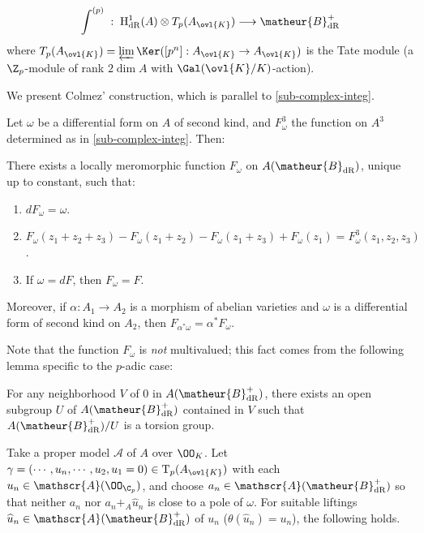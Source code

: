 \begin{equation*}
\int^{(p)}\;:\;\mathrm{H}^1_{\mathrm{dR}}(A) \otimes T_p(A_{\ovl{K}})
 \longrightarrow \matheur{B}^+_{\mathrm{dR}}
\end{equation*}
where $T_p(A_{\ovl{K}}) = \varprojlim \Ker([p^n]: A_{\ovl{K}}\rightarrow
A_{\ovl{K}})$ is the Tate module (a ${\Z}_p$-module of rank $2\dim A$
with $\Gal({\ovl{K}}/K)$-action).

We present Colmez' construction, which is parallel to \ref{sub-complex-integ}.

Let $\omega$ be a differential form on $A$ of second kind, and
$F_{\omega}^3$ the function on $A^3$ determined as in
\ref{sub-complex-integ}.  Then:
\begin{pro}
There exists a locally meromorphic function $F_{\omega}$ on 
$A(\matheur{B}_{\mathrm{dR}})$, unique up to constant, such that:

\begin{enumerate}
 \renewcommand{\theenumi}{\arabic{enumi}}
 \item $dF_{\omega}=\omega$.
 \item $F_{\omega}(z_1+z_2+z_3)-F_{\omega}(z_1+z_2)-
       F_{\omega}(z_1+z_3)+F_{\omega}(z_1)=F^3_{\omega}(z_1,z_2,z_3)$.
 \item If $\omega=dF$, then $F_{\omega}=F$.
\end{enumerate}

\noindent
Moreover, if $\alpha\colon A_1\rightarrow A_2$ is a morphism of abelian 
varieties and $\omega$ is a differential form of second kind on
$A_2$, then $F_{\alpha^{\ast}\omega}=\alpha^{\ast}F_{\omega}$.
\end{pro}

Note that the function $F_{\omega}$ is \emph{not} multivalued; this
fact comes from the following lemma specific to the $p$-adic case:

\begin{lem}
For any neighborhood $V$ of $0$ in $A(\matheur{B}_{\mathrm{dR}}^+)$, there
exists an open subgroup $U$ of $A(\matheur{B}_{\mathrm{dR}}^+)$ contained in 
$V$ such that $A(\matheur{B}_{\mathrm{dR}}^+)/U$ is a torsion group.
\end{lem}

Take a proper model $\mathscr{A}$ of $A$ over $\OO_{K}$.
Let $\gamma=(\cdots,u_n,\cdots,u_2,u_1=0)\in\mathrm{T}_p(A_{\ovl{K}})$ 
with each $u_n\in\mathscr{A}(\OO_{\C_p})$, and choose
$a_n\in\mathscr{A}(\matheur{B}^+_{\mathrm{dR}})$ so that neither
$a_n$ nor $a_n+_A\widehat{u}_n$ is close to a pole of $\omega$.
For suitable liftings 
$\widehat{u}_n\in\mathscr{A}(\matheur{B}^+_{\mathrm{dR}})$ of 
$u_n$ (\ie $\theta(\widehat{u}_n)=u_n$), the following holds. 

